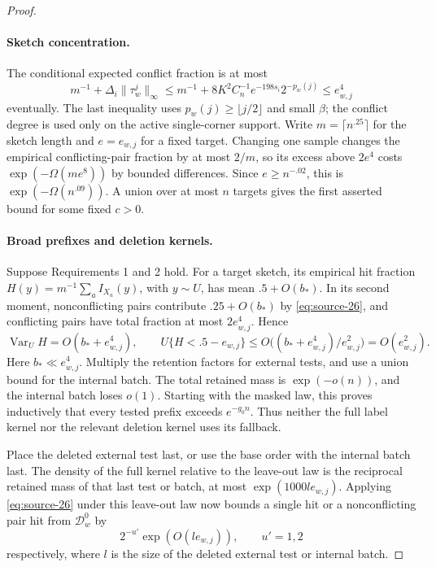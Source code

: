 \begin{proof}\leavevmode\par
\paragraph{Sketch concentration.}
The conditional expected conflict fraction is at most
\[
 m^{-1}+\Delta_i\|\tau_w^j\|_\infty
 \le m^{-1}+8K^2C_n^{-1}e^{-198s_i}2^{-p_w(j)}
 \le e_{w,j}^4
\]
eventually. The last inequality uses \(p_w(j)\ge\lfloor j/2\rfloor\)
and small \(\beta\); the conflict degree is used only on the active
single-corner support. Write \(m=\lceil n^{.25}\rceil\) for the sketch length and \(e=e_{w,j}\) for a fixed target. Changing one sample changes the empirical conflicting-pair fraction by at most \(2/m\), so its excess above \(2e^4\) costs \(\exp(-\Omega(m e^8))\) by bounded differences. Since \(e\ge n^{-.02}\), this is \(\exp(-\Omega(n^{.09}))\). A union over at most \(n\) targets gives the first asserted bound for some fixed \(c>0\).
\paragraph{Broad prefixes and deletion kernels.}
Suppose Requirements 1 and 2 hold. For a target sketch, its empirical
hit fraction \(H(y)=m^{-1}\sum_a I_{X_a}(y)\), with \(y\sim U\),
has mean \(.5+O(b_*)\). In its second moment, nonconflicting pairs
contribute \(.25+O(b_*)\) by \eqref{eq:source-26}, and conflicting
pairs have total fraction at most \(2e_{w,j}^4\). Hence
\[
 \operatorname{Var}_U H=O(b_*+e_{w,j}^4),\qquad
 U\{H<.5-e_{w,j}\}
 \le O\big((b_*+e_{w,j}^4)/e_{w,j}^2\big)=O(e_{w,j}^2).
\]
Here \(b_*\ll e_{w,j}^4\). Multiply the retention factors for external
tests, and use a union bound for the internal batch. The total retained
mass is \(\exp(-o(n))\), and the internal batch loses \(o(1)\).
Starting with the masked law, this proves inductively that every tested
prefix exceeds \(e^{-g_0n}\). Thus neither the full label kernel nor
the relevant deletion kernel uses its fallback.

Place the deleted external test last, or use the base order with the
internal batch last. The density of the full kernel relative to the
leave-out law is the reciprocal retained mass of that last test or
batch, at most \(\exp(1000l e_{w,j})\). Applying
\eqref{eq:source-26} under this leave-out law now bounds a single hit
or a nonconflicting pair hit from \(\mathcal D_w^0\) by
\begin{equation}
 2^{-u'}\exp(O(l e_{w,j})),\qquad u'=1,2                              \label{eq:source-27}
\end{equation}
respectively, where \(l\) is the size of the deleted external test or
internal batch.


\end{proof}
